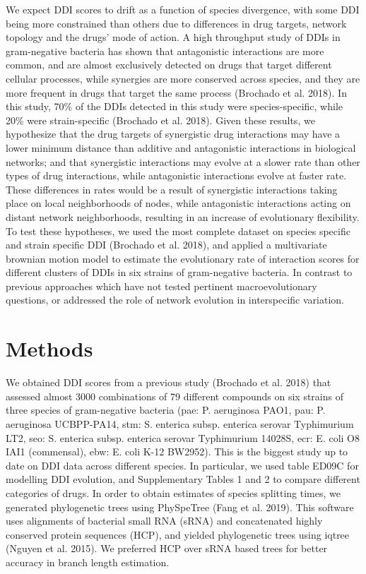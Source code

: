 \documentclass[]{elsarticle} %
\begin{document}
We expect DDI scores to drift as a function of species divergence, with some DDI being more constrained than others due to differences in drug targets, network topology and the drugs' mode of action. A high throughput study of DDIs in gram-negative bacteria has shown that antagonistic interactions are more common, and are almost exclusively detected on drugs that target different cellular processes, while synergies are more conserved across species, and they are more frequent in drugs that target the same process (Brochado et al. 2018). In this study, 70\% of the DDIs detected in this study were species-specific, while 20\% were strain-specific (Brochado et al. 2018). Given these results, we hypothesize that the drug targets of synergistic drug interactions may have a lower minimum distance than additive and antagonistic interactions in biological networks; and that synergistic interactions may evolve at a slower rate than other types of drug interactions, while antagonistic interactions evolve at faster rate. These differences in rates would be a result of synergistic interactions taking place on local neighborhoods of nodes, while antagonistic interactions acting on distant network neighborhoods, resulting in an increase of evolutionary flexibility. To test these hypotheses, we used the most complete dataset on species specific and strain specific DDI (Brochado et al. 2018), and applied a multivariate brownian motion model to estimate the evolutionary rate of interaction scores for different clusters of DDIs in six strains of gram-negative bacteria. In contrast to previous approaches which have not tested pertinent macroevolutionary questions, or addressed the role of network evolution in interspecific variation.

\hypertarget{methods}{%
\section{Methods}\label{methods}}

We obtained DDI scores from a previous study (Brochado et al. 2018) that assessed almost 3000 combinations of 79 different compounds on six strains of three species of gram-negative bacteria (pae: P. aeruginosa PAO1, pau: P. aeruginosa UCBPP-PA14, stm: S. enterica subsp. enterica serovar Typhimurium LT2, seo: S. enterica subsp. enterica serovar Typhimurium 14028S, ecr: E. coli O8 IAI1 (commensal), ebw: E. coli K-12 BW2952). This is the biggest study up to date on DDI data across different species. In particular, we used table ED09C for modelling DDI evolution, and Supplementary Tables 1 and 2 to compare different categories of drugs. In order to obtain estimates of species splitting times, we generated phylogenetic trees using PhySpeTree (Fang et al. 2019). This software uses alignments of bacterial small RNA (sRNA) and concatenated highly conserved protein sequences (HCP), and yielded phylogenetic trees using iqtree (Nguyen et al. 2015). We preferred HCP over sRNA based trees for better accuracy in branch length estimation.
\end{document}
